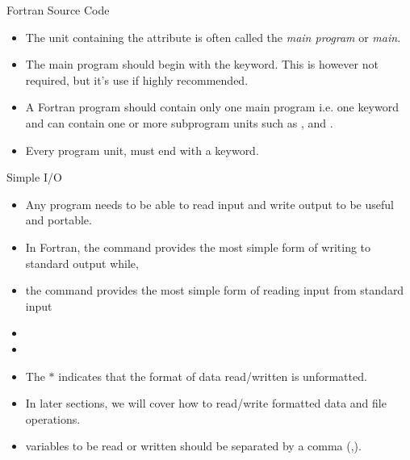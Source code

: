 \documentclass[10pt,t]{beamer}
\begin{document}
\begin{frame}{Fortran Source Code}
\begin{itemize}
      \begin{itemize}
        \item {}
        \item {}
        \item {}
        \item {}
      \end{itemize}
    \item The unit containing the  attribute is often called the {\em main program} or {\em main}.
    \item The main program should begin with the  keyword. This is however not required, but it's use if highly recommended.
    \item A Fortran program should contain only one main program i.e. one  keyword and can contain one or more subprogram units such as ,  and .
    \item Every program unit, must end with a  keyword.
  \end{itemize}
\end{frame}

\begin{frame}{Simple I/O}
  \begin{itemize}
    \item Any program needs to be able to read input and write output to be useful and portable.
    \item In Fortran, the  command provides the most simple form of writing to standard output while,
    \item the  command provides the most simple form of reading input from standard input
    \item {}
    \item {}
    \item The $\ast$ indicates that the format of data read/written is unformatted.
    \item In later sections, we will cover how to read/write formatted data and file operations.
    \item variables to be read or written should be separated by a comma (,).
  \end{itemize}
\end{frame}
\end{document}
